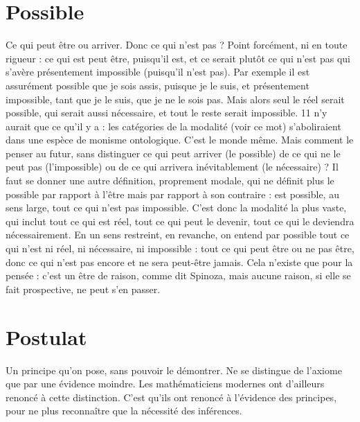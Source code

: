 \section{Possible}
Ce qui peut être ou arriver. Donc ce qui n’est pas ? Point forcément,
ni en toute rigueur : ce qui est peut être, puisqu'il est, et
ce serait plutôt ce qui n’est pas qui s’avère présentement impossible (puisqu'il
n'est pas). Par exemple il est assurément possible que je sois assis, puisque je le
suis, et présentement impossible, tant que je le suis, que je ne le sois pas. Mais
alors seul le réel serait possible, qui serait aussi nécessaire, et tout le reste serait
impossible. 11 n’y aurait que ce qu’il y a : les catégories de la modalité (voir ce
mot) s’aboliraient dans une espèce de monisme ontologique. C’est le monde
même. Mais comment le penser au futur, sans distinguer ce qui peut arriver (le
possible) de ce qui ne le peut pas (l’impossible) ou de ce qui arrivera inévitablement
(le nécessaire) ? Il faut se donner une autre définition, proprement
modale, qui ne définit plus le possible par rapport à l'être mais par rapport à
son contraire : est possible, au sens large, tout ce qui n’est pas impossible. C’est
donc la modalité la plus vaste, qui inclut tout ce qui est réel, tout ce qui peut
le devenir, tout ce qui le deviendra nécessairement. En un sens restreint, en
revanche, on entend par possible tout ce qui n’est ni réel, ni nécessaire, ni
impossible : tout ce qui peut être ou ne pas être, donc ce qui n’est pas encore
et ne sera peut-être jamais. Cela n'existe que pour la pensée : c’est un être de
raison, comme dit Spinoza, mais aucune raison, si elle se fait prospective, ne
peut s’en passer.

\section{Postulat}
Un principe qu’on pose, sans pouvoir le démontrer. Ne se distingue
de l’axiome que par une évidence moindre. Les mathématiciens
modernes ont d’ailleurs renoncé à cette distinction. C’est qu'ils ont
renoncé à l'évidence des principes, pour ne plus reconnaître que la nécessité des
inférences.

